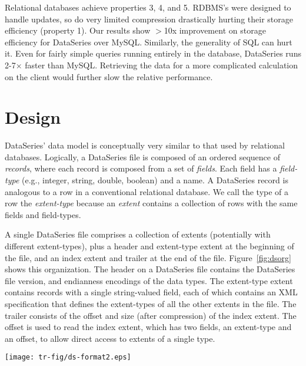 \documentclass{acm_proc_article-sp}
\begin{document}
Relational databases achieve properties 3, 4, and 5. RDBMS's were
designed to handle updates, so do very limited compression drastically
hurting their storage efficiency (property 1).  Our results show
$>$10x improvement on storage efficiency for DataSeries over
MySQL. 
Similarly, the generality of SQL can hurt it.  Even for fairly simple
queries running entirely in the database, DataSeries runs 2-7$\times$
faster than MySQL. 
Retrieving the data for a more complicated
calculation on the client would further slow the relative performance.

\section{Design}\label{sec:design}

DataSeries' data model is conceptually very similar to that used by
relational databases.  Logically, a DataSeries file is composed of an
ordered sequence of {\it records}, where each record is composed from
a set of {\it fields}. Each field has a {\it field-type} (e.g.,
integer, string, double, boolean) and a name. A DataSeries record is
analogous to a row in a conventional relational database. We call the
type of a row the {\it extent-type} because an {\it extent} contains a
collection of rows with the same fields and field-types.

A single DataSeries file comprises a collection of extents
(potentially with different extent-types), plus a header and
extent-type extent at the beginning of the file, and an index extent
and trailer at the end of the file. Figure~\ref{fig:dsorg} shows this
organization.  The header on a DataSeries file contains the DataSeries
file version, and endianness encodings of the data types.  The
extent-type extent contains records with a single string-valued field,
each of which contains an XML specification that defines the
extent-types of all the other extents in the file. The trailer
consists of the offset and size (after compression) of the index
extent.  The offset is used to read the index extent, which has two
fields, an extent-type and an offset, to allow direct access to
extents of a single type.

\begin{figure*}
\hfil\texttt{[image: tr-fig/ds-format2.eps]}\hfil
\caption{Internal structure of a DataSeries file. }
\label{fig:dsorg}
\end{figure*}
\end{document}
